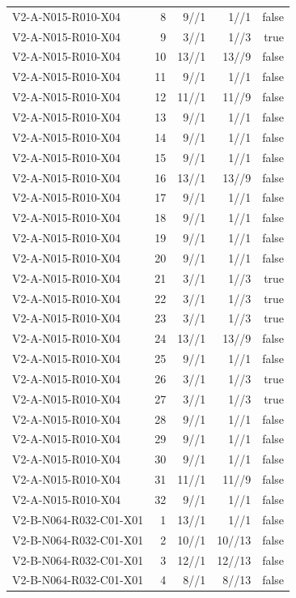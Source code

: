 {\begin{longtable}{lrrrr}
V2-A-N015-R010-X04 & 8 & 9//1 & 1//1 & false \\
V2-A-N015-R010-X04 & 9 & 3//1 & 1//3 & true \\
V2-A-N015-R010-X04 & 10 & 13//1 & 13//9 & false \\
V2-A-N015-R010-X04 & 11 & 9//1 & 1//1 & false \\
V2-A-N015-R010-X04 & 12 & 11//1 & 11//9 & false \\
V2-A-N015-R010-X04 & 13 & 9//1 & 1//1 & false \\
V2-A-N015-R010-X04 & 14 & 9//1 & 1//1 & false \\
V2-A-N015-R010-X04 & 15 & 9//1 & 1//1 & false \\
V2-A-N015-R010-X04 & 16 & 13//1 & 13//9 & false \\
V2-A-N015-R010-X04 & 17 & 9//1 & 1//1 & false \\
V2-A-N015-R010-X04 & 18 & 9//1 & 1//1 & false \\
V2-A-N015-R010-X04 & 19 & 9//1 & 1//1 & false \\
V2-A-N015-R010-X04 & 20 & 9//1 & 1//1 & false \\
V2-A-N015-R010-X04 & 21 & 3//1 & 1//3 & true \\
V2-A-N015-R010-X04 & 22 & 3//1 & 1//3 & true \\
V2-A-N015-R010-X04 & 23 & 3//1 & 1//3 & true \\
V2-A-N015-R010-X04 & 24 & 13//1 & 13//9 & false \\
V2-A-N015-R010-X04 & 25 & 9//1 & 1//1 & false \\
V2-A-N015-R010-X04 & 26 & 3//1 & 1//3 & true \\
V2-A-N015-R010-X04 & 27 & 3//1 & 1//3 & true \\
V2-A-N015-R010-X04 & 28 & 9//1 & 1//1 & false \\
V2-A-N015-R010-X04 & 29 & 9//1 & 1//1 & false \\
V2-A-N015-R010-X04 & 30 & 9//1 & 1//1 & false \\
V2-A-N015-R010-X04 & 31 & 11//1 & 11//9 & false \\
V2-A-N015-R010-X04 & 32 & 9//1 & 1//1 & false \\
V2-B-N064-R032-C01-X01 & 1 & 13//1 & 1//1 & false \\
V2-B-N064-R032-C01-X01 & 2 & 10//1 & 10//13 & false \\
V2-B-N064-R032-C01-X01 & 3 & 12//1 & 12//13 & false \\
V2-B-N064-R032-C01-X01 & 4 & 8//1 & 8//13 & false \\

\end{longtable}}
